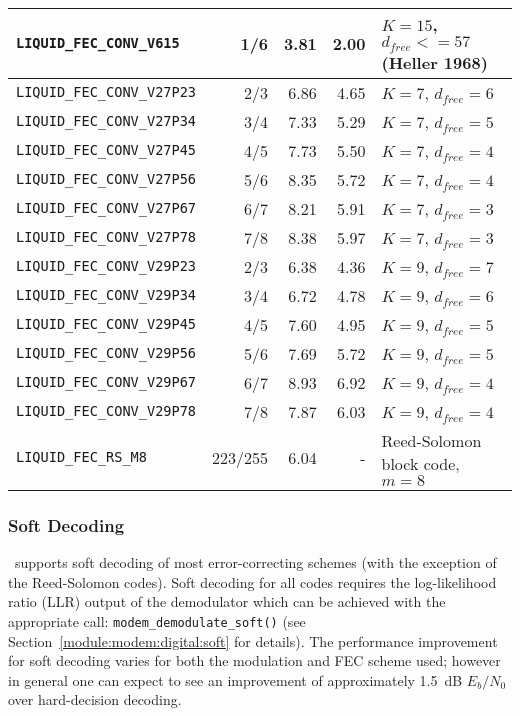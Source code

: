 \begin{table*}
{\begin{tabular*}{0.95\textwidth}{l@{\extracolsep{\fill}}rrrl}
{\tt LIQUID\_FEC\_CONV\_V615}   & 1/6     &  3.81 & 2.00 & $K=15$, $d_{free}<=57$ (Heller 1968)\\\midrule
%
{\tt LIQUID\_FEC\_CONV\_V27P23} & 2/3     &  6.86 & 4.65 & $K=7$, $d_{free}=6$\\
{\tt LIQUID\_FEC\_CONV\_V27P34} & 3/4     &  7.33 & 5.29 & $K=7$, $d_{free}=5$\\
{\tt LIQUID\_FEC\_CONV\_V27P45} & 4/5     &  7.73 & 5.50 & $K=7$, $d_{free}=4$\\
{\tt LIQUID\_FEC\_CONV\_V27P56} & 5/6     &  8.35 & 5.72 & $K=7$, $d_{free}=4$\\
{\tt LIQUID\_FEC\_CONV\_V27P67} & 6/7     &  8.21 & 5.91 & $K=7$, $d_{free}=3$\\
{\tt LIQUID\_FEC\_CONV\_V27P78} & 7/8     &  8.38 & 5.97 & $K=7$, $d_{free}=3$\\\midrule
%
{\tt LIQUID\_FEC\_CONV\_V29P23} & 2/3     &  6.38 & 4.36 & $K=9$, $d_{free}=7$\\
{\tt LIQUID\_FEC\_CONV\_V29P34} & 3/4     &  6.72 & 4.78 & $K=9$, $d_{free}=6$\\
{\tt LIQUID\_FEC\_CONV\_V29P45} & 4/5     &  7.60 & 4.95 & $K=9$, $d_{free}=5$\\
{\tt LIQUID\_FEC\_CONV\_V29P56} & 5/6     &  7.69 & 5.72 & $K=9$, $d_{free}=5$\\
{\tt LIQUID\_FEC\_CONV\_V29P67} & 6/7     &  8.93 & 6.92 & $K=9$, $d_{free}=4$\\
{\tt LIQUID\_FEC\_CONV\_V29P78} & 7/8     &  7.87 & 6.03 & $K=9$, $d_{free}=4$\\\midrule
% 
{\tt LIQUID\_FEC\_RS\_M8}       & 223/255 &  6.04 &    - & Reed-Solomon block code, $m=8$\\\bottomrule


\end{tabular*}
}
\end{table*}%

\subsubsection{Soft Decoding}
\label{module:fec:soft}
\liquid\ supports soft decoding of most error-correcting schemes
(with the exception of the Reed-Solomon codes).
Soft decoding for all codes requires the log-likelihood ratio (LLR)
output of the demodulator which can be achieved with the appropriate
call: {\tt modem\_demodulate\_soft()}
(see Section~\ref{module:modem:digital:soft} for details).
The performance improvement for soft decoding varies for both the
modulation and FEC scheme used;
however in general one can expect to see an improvement of approximately
1.5~dB $E_b/N_0$ over hard-decision decoding.

